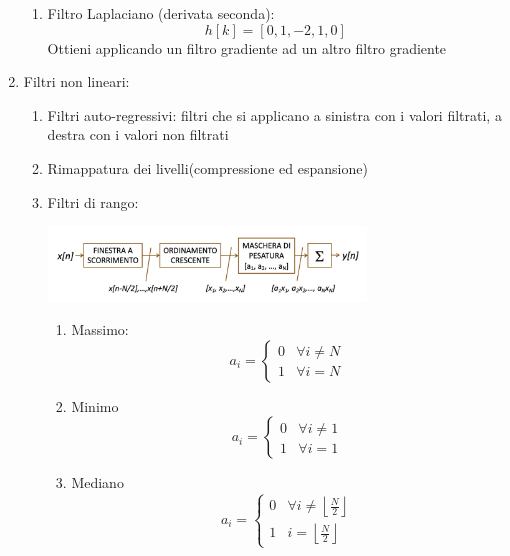 \begin{enumerate}
\begin{enumerate}
		      \item Filtro Laplaciano (derivata seconda):
		            \[
			            h[k] = [0, 1, -2, 1, 0]
		            \]
		            Ottieni applicando un filtro gradiente ad un altro filtro gradiente
	      \end{enumerate}
	\item Filtri non lineari:
	      \begin{enumerate}
		      \item Filtri auto-regressivi: filtri che si applicano a sinistra con i valori filtrati, a destra con i valori non filtrati
		      \item Rimappatura dei livelli(compressione ed espansione)
		      \item Filtri di rango:
		            \begin{center}
			            \includegraphics[width=0.7\textwidth]{Images/Filtri di rango.png }
		            \end{center}
		            \begin{enumerate}
			            \item Massimo:
			                  \[
				                  a_i = \begin{cases}
					                  0 & \forall i \neq N \\
					                  1 & \forall i = N
				                  \end{cases}
			                  \]
			            \item  Minimo
			                  \[
				                  a_i = \begin{cases}
					                  0 & \forall i \neq 1 \\
					                  1 & \forall i = 1
				                  \end{cases}
			                  \]
			            \item  Mediano
			                  \[
				                  a_i = \begin{cases}
					                  0 & \forall i \neq \left\lfloor \frac{N}{2}\right\rfloor \\
					                  1 & i = \left\lfloor \frac{N}{2}\right\rfloor
				                  \end{cases}
			                  \]
		            \end{enumerate}
	      \end{enumerate}
\end{enumerate}

